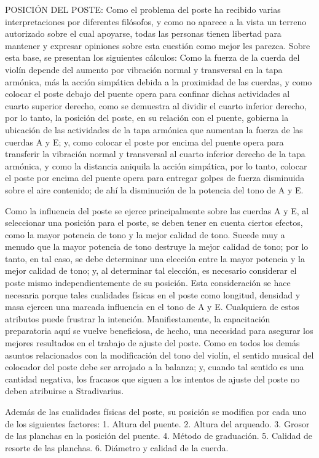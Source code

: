 \documentclass[12pt]{book}
\begin{document}
POSICIÓN DEL POSTE: Como el problema del poste ha recibido varias interpretaciones por diferentes filósofos, y como no aparece a la vista un terreno autorizado sobre el cual apoyarse, todas las personas tienen libertad para mantener y expresar opiniones sobre esta cuestión como mejor les parezca. Sobre esta base, se presentan los siguientes cálculos: Como la fuerza de la cuerda del violín depende del aumento por vibración normal y transversal en la tapa armónica, más la acción simpática debida a la proximidad de las cuerdas, y como colocar el poste debajo del puente opera para confinar dichas actividades al cuarto superior derecho, como se demuestra al dividir el cuarto inferior derecho, por lo tanto, la posición del poste, en su relación con el puente, gobierna la ubicación de las actividades de la tapa armónica que aumentan la fuerza de las cuerdas A y E; y, como colocar el poste por encima del puente opera para transferir la vibración normal y transversal al cuarto inferior derecho de la tapa armónica, y como la distancia aniquila la acción simpática, por lo tanto, colocar el poste por encima del puente opera para entregar golpes de fuerza disminuida sobre el aire contenido; de ahí la disminución de la potencia del tono de A y E.

Como la influencia del poste se ejerce principalmente sobre las cuerdas A y E, al seleccionar una posición para el poste, se deben tener en cuenta ciertos efectos, como la mayor potencia de tono y la mejor calidad de tono. Sucede muy a menudo que la mayor potencia de tono destruye la mejor calidad de tono; por lo tanto, en tal caso, se debe determinar una elección entre la mayor potencia y la mejor calidad de tono; y, al determinar tal elección, es necesario considerar el poste mismo independientemente de su posición. Esta consideración se hace necesaria porque tales cualidades físicas en el poste como longitud, densidad y masa ejercen una marcada influencia en el tono de A y E. Cualquiera de estos atributos puede frustrar la intención. Manifiestamente, la capacitación preparatoria aquí se vuelve beneficiosa, de hecho, una necesidad para asegurar los mejores resultados en el trabajo de ajuste del poste. Como en todos los demás asuntos relacionados con la modificación del tono del violín, el sentido musical del colocador del poste debe ser arrojado a la balanza; y, cuando tal sentido es una cantidad negativa, los fracasos que siguen a los intentos de ajuste del poste no deben atribuirse a Stradivarius.

Además de las cualidades físicas del poste, su posición se modifica por cada uno de los siguientes factores: 1. Altura del puente. 2. Altura del arqueado. 3. Grosor de las planchas en la posición del puente. 4. Método de graduación. 5. Calidad de resorte de las planchas. 6. Diámetro y calidad de la cuerda.
\end{document}
